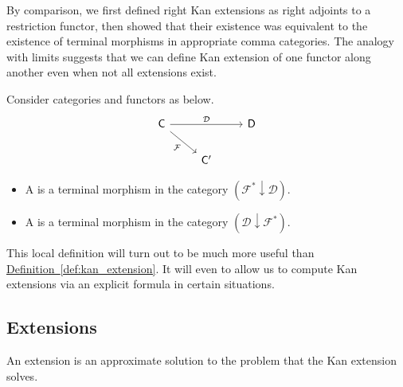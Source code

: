 \documentclass[notes.tex]{subfiles}
\begin{document}
By comparison, we first defined right Kan extensions as right adjoints to a restriction functor, then showed that their existence was equivalent to the existence of terminal morphisms in appropriate comma categories. The analogy with limits suggests that we can define Kan extension of one functor along another even when not all extensions exist.

\begin{definition}
  \label{def:local_kan_extension}
  Consider categories and functors as below.
  \begin{equation*}
    \begin{tikzcd}
      \mathsf{C}
      \arrow[dr, swap, "\mathcal{F}"]
      \arrow[rr, "\mathcal{D}"]
      && \mathsf{D}
      \\
      & \mathsf{C'}
    \end{tikzcd}
  \end{equation*}
  \begin{itemize}
    \item A  is a terminal morphism in the category $(\mathcal{F}^{*} \downarrow \mathcal{D})$.

    \item A  is a terminal morphism in the category $(\mathcal{D}\downarrow \mathcal{F}^{*})$.
  \end{itemize}
\end{definition}

This local definition will turn out to be much more useful than \hyperref[def:kan_extension]{Definition~\ref*{def:kan_extension}}. It will even to allow us to compute Kan extensions via an explicit formula in certain situations.

\subsection{Extensions}
\label{ssc:extensions}

An extension is an approximate solution to the problem that the Kan extension solves.
\end{document}
